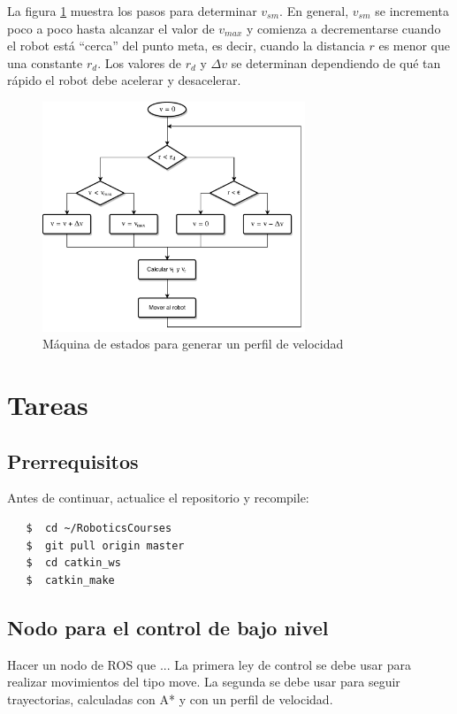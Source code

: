 \documentclass[letterpaper,12pt]{article}
\begin{document}
La figura \ref{fig:AFSM} muestra los pasos para determinar $v_{sm}$. En general, $v_{sm}$ se incrementa poco a poco hasta alcanzar el valor de $v_{max}$ y comienza a decrementarse cuando el robot está ``cerca'' del punto meta, es decir, cuando la distancia $r$ es menor que una constante $r_d$. Los valores de $r_d$ y $\Delta v$ se determinan dependiendo de qué tan rápido el robot debe acelerar y desacelerar. 

\begin{figure}[!h]
  \centering
  \includegraphics[width=0.7\textwidth]{Figures/AFSM.pdf}
  \caption{Máquina de estados para generar un perfil de velocidad}
  \label{fig:AFSM}
\end{figure}

\section{Tareas}

\subsection{Prerrequisitos}
Antes de continuar, actualice el repositorio y recompile:
\begin{verbatim}
   $  cd ~/RoboticsCourses
   $  git pull origin master
   $  cd catkin_ws
   $  catkin_make
\end{verbatim}

\subsection{Nodo para el control de bajo nivel}
Hacer un nodo de ROS que ...
La primera ley de control se debe usar para realizar movimientos del tipo move.
La segunda se debe usar para seguir trayectorias, calculadas con A* y con un perfil de velocidad. 
\end{document}
